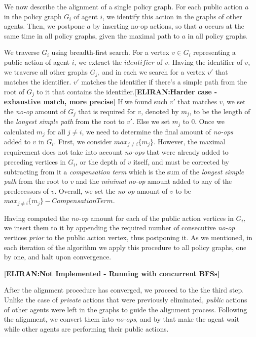 \documentclass[letterpaper]{article} %
\newcommand{\eliran}[1]{\textbf{[\color{red}ELIRAN:#1]}}
\begin{document}
We now describe the alignment of a single policy graph. For each public action $a$ in the policy graph $G_i$ of agent $i$, we identify this action in the graphs of other agents.
Then, we postpone $a$ by inserting no-op actions, so that $a$ occurs at the same time in all policy graphs, given the maximal path to $a$ in all policy graphs.

We traverse $G_i$ using breadth-first search. For a vertex $v\in G_i$ representing a public action of agent $i$, we extract the $identifier$ of $v$. Having the identifier of $v$, we traverse all other graphs $G_j$, and in each we search for a vertex $v'$ that matches the identifier. $v'$ matches the identifier if there's a simple path from the root of $G_j$ to it that contains the identifier.\eliran{Harder case - exhaustive match, more precise}
If we found such $v'$ that matches $v$, we set the {\em no-op} amount of $G_j$ that is required for $v$, denoted by $m_j$, to be the length of the \emph{longest simple path} from the root to $v'$. Else we set $m_j$ to 0.
Once we calculated $m_j$ for all $j\neq i$, we need to determine the final amount of {\em no-ops} added to $v$ in $G_i$. First, we consider $max_{j\neq i}\{m_j\}$. However, the maximal requirement does not take into account {\em no-ops} that were already added to preceding vertices in $G_i$, or the depth of $v$ itself, and must be
corrected by subtracting from it a \emph{compensation term} which is the sum of the \emph{longest simple path} from the root to $v$ and the \emph{minimal} {\em no-op} amount added to any of the predecessors of $v$. Overall, we set the {\em no-op} amount of $v$ to be $max_{j\neq i}\{m_j\} - \mathit{CompensationTerm}$.

Having computed the  {\em no-op} amount for each of the public action vertices in $G_i$, we insert them to it by appending the required number of consecutive {\em no-op} vertices \emph{prior} to the public action vertex, thus postponing it.
As we mentioned, in each iteration of the algorithm we apply this procedure to all policy graphs, one by one, and halt upon convergence.

\eliran{Not Implemented - Running with concurrent BFSs}

After the alignment procedure has converged, we proceed to the the third step. Unlike the case of \emph{private} actions that were previously eliminated, \emph{public} actions of other agents were left in the graphs to guide the alignment process. Following the alignment, we convert them into \emph{no-ops}, and by that make the agent wait while other agents are performing their public actions.
\end{document}
